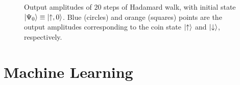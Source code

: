 \begin{figure}[]
    \centering
    \qquad
    \caption{
        Output amplitudes of $20$ steps of Hadamard walk, with initial state $\ket{\Psi_0}\equiv\ket{\uparrow,0}$.
        Blue (circles) and orange (squares) points are the output amplitudes corresponding to the coin state $\ket\uparrow$ and $\ket\downarrow$, respectively.
    }
    \label{fig:hadamardwalk_Nsteps}
\end{figure}

\section{Machine Learning}
\label{sec:intro:ML}


